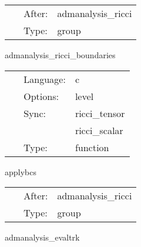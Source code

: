 \documentclass{article}
\begin{document}
\hspace{5mm}

 \begin{tabular*}{160mm}{cll} 
~ & After:  & admanalysis\_ricci \\ 
~ & Type:  & group \\ 
\end{tabular*} 


\vspace{5mm}


\hspace{5mm} admanalysis\_ricci\_boundaries 

\hspace{5mm}{\it select boundary conditions for the ricci tensor } 


\hspace{5mm}

 \begin{tabular*}{160mm}{cll} 
~ & Language:  & c \\ 
~ & Options:  & level \\ 
~ & Sync:  & ricci\_tensor \\ 
~& ~ &ricci\_scalar\\ 
~ & Type:  & function \\ 
\end{tabular*} 


\vspace{5mm}


\hspace{5mm} applybcs 

\hspace{5mm}{\it apply boundary conditions to the ricci tensor } 


\hspace{5mm}

 \begin{tabular*}{160mm}{cll} 
~ & After:  & admanalysis\_ricci \\ 
~ & Type:  & group \\ 
\end{tabular*} 


\vspace{5mm}


\hspace{5mm} admanalysis\_evaltrk 

\hspace{5mm}{\it compute the trace of the extrinsic curvature and the determinant of the metric } 
\end{document}
